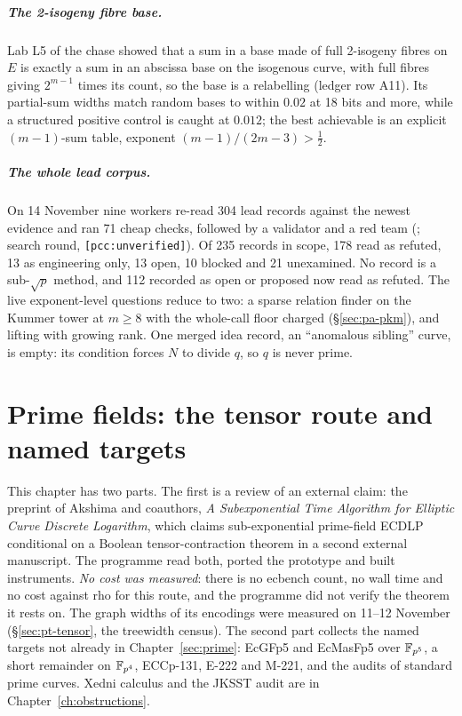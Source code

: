 \paragraph{The 2-isogeny fibre base.} Lab L5 of the chase showed that a sum
in a base made of full 2-isogeny fibres on $E$ is exactly a sum in an
abscissa base on the isogenous curve, with full fibres giving $2^{m-1}$ times
its count, so the base is a relabelling (ledger row A11). Its partial-sum
widths match random bases to within $0.02$ at 18 bits and more, while a
structured positive control is caught at $0.012$; the best achievable is an
explicit $(m-1)$-sum table, exponent $(m-1)/(2m-3)>\tfrac12$.

\paragraph{The whole lead corpus.} On 14 November nine workers re-read 304
lead records against the newest evidence and ran 71 cheap checks, followed
by a validator and a red team
(; search round,
\texttt{[pcc:unverified]}). Of 235 records in scope, 178 read as refuted, 13
as engineering only, 13 open, 10 blocked and 21 unexamined. No record is a
sub-$\sqrt p$ method, and 112 recorded as open or proposed now read as
refuted. The live exponent-level questions reduce to two: a sparse relation
finder on the Kummer tower at $m\ge8$ with the whole-call floor charged
(\S\ref{sec:pa-pkm}), and lifting with growing rank. One merged idea record,
an ``anomalous sibling'' curve, is empty: its condition forces $N$ to divide
$q$, so $q$ is never prime.

\chapter{Prime fields: the tensor route and named targets}\label{ch:primetargets}

This chapter has two parts. The first is a review of an external claim:
the preprint of Akshima and coauthors, \emph{A Subexponential Time Algorithm
for Elliptic Curve Discrete Logarithm}, which claims sub-exponential
prime-field ECDLP conditional on a Boolean tensor-contraction theorem in a
second external manuscript. The programme read both, ported the prototype
and built instruments. \emph{No cost was measured}: there is no ecbench
count, no wall time and no cost against rho for this route, and the
programme did not verify the theorem it rests on. The graph widths of its
encodings were measured on 11--12 November (\S\ref{sec:pt-tensor}, the
treewidth census). The second part collects
the named targets not already in Chapter~\ref{sec:prime}: EcGFp5 and
EcMasFp5 over $\mathbb{F}_{p^5}$, a short remainder on $\mathbb{F}_{p^4}$, ECCp-131,
E-222 and M-221, and the audits of standard prime curves. Xedni calculus and the JKSST audit
are in Chapter~\ref{ch:obstructions}.

